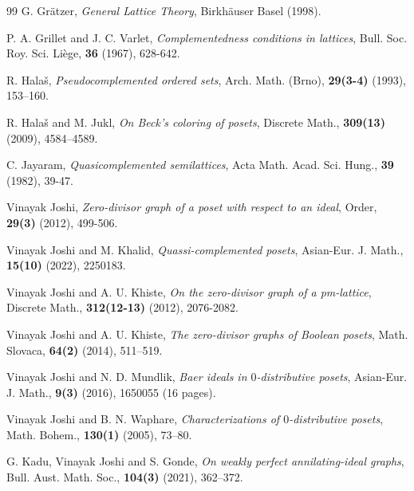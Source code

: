 \documentclass[10pt,one side,emlines]{amsart}
\theoremstyle{definition}
\begin{document}
\begin{thebibliography}{99}
	 G. Gr\"atzer, {\it General Lattice Theory}, Birkh\"auser Basel (1998).
	
	 P. A. Grillet and J. C. Varlet, {\it Complementedness conditions in lattices}, Bull. Soc. Roy. Sci. Liège, {\bf 36} (1967), 628-642.
		
		R. Hala\v{s},  {\it Pseudocomplemented ordered sets}, Arch. Math. (Brno), {\bf 29(3-4)} (1993), 153–160.
	
	 R. Hala\v{s} and M. Jukl, {\it On Beck’s coloring of posets}, Discrete Math., {\bf 309(13)} (2009), 4584–4589.
	
		
		C. Jayaram, {\it Quasicomplemented semilattices}, Acta Math. Acad. Sci. Hung., {\bf 39} (1982), 39-47.
	
		
	 Vinayak Joshi, {\it Zero-divisor graph of a poset with respect to an ideal}, Order, {\bf 29(3)} (2012), 499-506.
	
	 Vinayak Joshi and M. Khalid, {\it Quassi-complemented posets}, Asian-Eur. J. Math., {\bf 15(10)} (2022), 2250183.
	
	 Vinayak Joshi  and A. U. Khiste, {\it On the zero-divisor graph of a pm-lattice}, Discrete Math., {\bf 312(12-13)} (2012), 2076-2082.
	
	 Vinayak Joshi  and A. U. Khiste, {\it  The zero-divisor graphs of Boolean posets}, Math. Slovaca, {\bf 64(2)} (2014), 511–519.
	
	
	 Vinayak Joshi and N. D. Mundlik, {\it Baer ideals in $0$-distributive posets}, Asian-Eur. J. Math., {\bf 9(3)} (2016), 1650055 (16 pages).
	
	 Vinayak Joshi and B. N. Waphare, {\it Characterizations of $0$-distributive posets}, Math. Bohem., {\bf 130(1)} (2005), 73–80. 
	
	  G. Kadu, Vinayak Joshi and S. Gonde, {\it On weakly perfect annilating-ideal graphs}, Bull. Aust. Math. Soc., {\bf 104(3)} (2021), 362–372.
	

\end{thebibliography}
\end{document}
